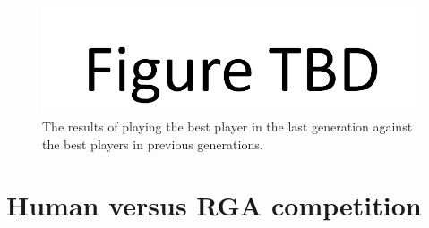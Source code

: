 \begin{figure}[htp]
\centerline{\includegraphics[width=0.75\columnwidth]{Figures/figureTBD.png}}
\caption[Validation - Comparing population sizes]{The results of playing the
best player in the last generation against the best players in previous
generations.}
\label{figure-interpopulation2}
\end{figure}

\section{Human versus RGA competition}
